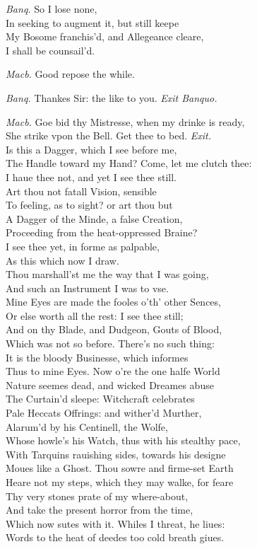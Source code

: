 \documentclass[12pt]{sides}
\newcommand{\clStageDir}[1]{\hspace*{\fill}\textit{#1}\hspace*{\fill}}
\newcommand{\elStageDir}[1]{\hfill\textit{#1}}
\newcommand{\dia}[1]{\hskip 15pt\textit{#1}\hskip 6pt}
\begin{document}
\begin{multicols}{2}
            \dia{Banq.} So I lose none, \\ In seeking to augment it, but still keepe \\ My Bosome franchis'd, and Allegeance cleare, \\ I shall be counsail'd.

            \dia{Macb.} Good repose the while.

            \dia{Banq.} Thankes Sir: the like to you. \clStageDir{Exit Banquo.}

            \dia{Macb.} Goe bid thy Mistresse, when my drinke is ready, \\ She strike vpon the Bell. Get thee to bed. \elStageDir{Exit.} \hspace{16pt} \\ Is this a Dagger, which I see before me, \\ The Handle toward my Hand? Come, let me clutch thee: \\ I haue thee not, and yet I see thee still. \\ Art thou not fatall Vision, sensible \\ To feeling, as to sight? or art thou but \\ A Dagger of the Minde, a false Creation, \\ Proceeding from the heat-oppressed Braine? \\ I see thee yet, in forme as palpable, \\ As this which now I draw. \\ Thou marshall'st me the way that I was going, \\ And such an Instrument I was to vse. \\ Mine Eyes are made the fooles o'th' other Sences, \\ Or else worth all the rest: I see thee still; \\ And on thy Blade, and Dudgeon, Gouts of Blood, \\ Which was not so before. There's no such thing: \\ It is the bloody Businesse, which informes \\ Thus to mine Eyes. Now o're the one halfe World \\ Nature seemes dead, and wicked Dreames abuse \\ The Curtain'd sleepe: Witchcraft celebrates \\ Pale Heccats Offrings: and wither'd Murther, \\ Alarum'd by his Centinell, the Wolfe, \\ Whose howle's his Watch, thus with his stealthy pace, \\ With Tarquins rauishing sides, towards his designe \\ Moues like a Ghost. Thou sowre and firme-set Earth \\ Heare not my steps, which they may walke, for feare \\ Thy very stones prate of my where-about, \\ And take the present horror from the time, \\ Which now sutes with it. Whiles I threat, he liues: \\ Words to the heat of deedes too cold breath giues.


\end{multicols}
\end{document}
